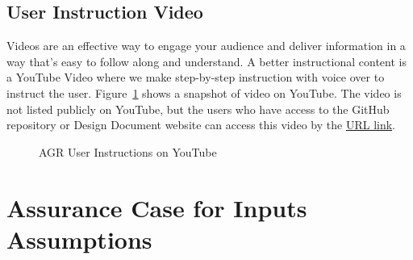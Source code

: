 \subsection{User Instruction Video}\label{user_instruction_video}
Videos are an effective way to engage your audience and deliver information in a way that's easy to follow along and understand. A better instructional content is a YouTube Video where we make step-by-step instruction with voice over to instruct the user. Figure~\ref{fig_video} shows a snapshot  of video on YouTube. The video is not listed publicly on YouTube, but the users who have access to the GitHub repository or Design Document website can access this video by the \href{https://www.youtube.com/watch?v=1eK5k6bazNs}{URL link}.

\begin{figure}[H]
    \centering
    \caption[AGR User Instructions on YouTube]{AGR User Instructions on YouTube}
    \label{fig_video}
\end{figure}


\section{Assurance Case for Inputs Assumptions}


